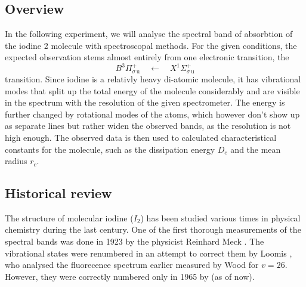 \subsection{Overview}
In the following experiment, we will analyse the spectral band of absorbtion of the iodine 2 molecule 
with spectroscopal methods. For the given conditions, the expected observation stems almost 
entirely from one electronic transition, the 
\begin{equation}
    B ^3\Pi_{\sigma \, \mathrm{u}}^{+} \quad \leftarrow \quad X ^1\Sigma_{\sigma \, \mathrm{u}}^{+}
\end{equation}
transition. Since iodine is a relativly heavy di-atomic molecule, it has vibrational modes that 
split up the total energy of the molecule considerably and are visible in the spectrum with the 
resolution of the given spectrometer. The energy is further changed by rotational modes of the 
atoms, which however don't show up as separate lines but rather widen the observed bands, as the 
resolution is not high enough. 
The observed data is then used to calculated characteristical constants for the molecule, such as 
the dissipation energy $D_e$ and the mean radius $r_c$. 

\subsection{Historical review}
The structure of molecular iodine ($I_2$) has been studied various times in physical chemistry 
during the last century. One of the first thorough measurements of the spectral bands was done in 
1923 by the physicist Reinhard Meck \cite{mecke1923bandenspektrum}. The vibrational states 
were renumbered in an attempt to correct them by Loomis \cite{loomis1927correlation}, who analysed 
the fluorecence spectrum earlier measured by Wood \cite{wood1911} for $v = 26$. However, they were 
correctly numbered only in 1965 by \cite{steinfeld1965spectroscopic} (as of now). 


